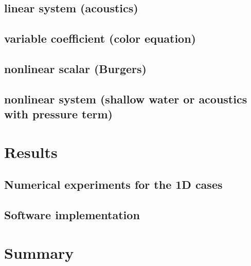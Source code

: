 \documentclass[12pt]{article}
\begin{document}
\subsection{linear system (acoustics)}
\subsection{variable coefficient (color equation)}
\subsection{nonlinear scalar (Burgers)}
\subsection{nonlinear system (shallow water or acoustics with pressure term)}

\section{Results}
\subsection{Numerical experiments for the 1D cases}
\subsection{Software implementation}

\section{Summary}
\end{document}
